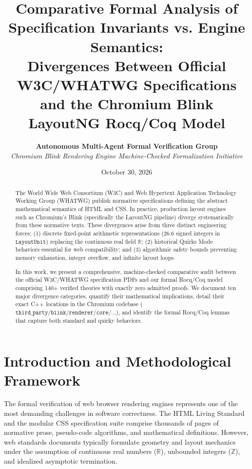 \documentclass[11pt,a4paper]{article}
\title{\textbf{\Large Comparative Formal Analysis of Specification Invariants vs. Engine Semantics:}\\[0.4em]
\large Divergences Between Official W3C/WHATWG Specifications and the Chromium Blink LayoutNG Rocq/Coq Model}
\author{\textbf{Autonomous Multi-Agent Formal Verification Group} \\
\textit{Chromium Blink Rendering Engine Machine-Checked Formalization Initiative}}
\date{October 30, 2026}
\theoremstyle{definition}
\begin{document}
\maketitle

\begin{abstract}
The World Wide Web Consortium (W3C) and Web Hypertext Application Technology Working Group (WHATWG) publish normative specifications defining the abstract mathematical semantics of HTML and CSS. In practice, production layout engines such as Chromium's Blink (specifically the LayoutNG pipeline) diverge systematically from these normative texts. These divergences arise from three distinct engineering forces: (1) discrete fixed-point arithmetic representations ($26.6$ signed integers in $\mathtt{LayoutUnit}$) replacing the continuous real field $\mathbb{R}$; (2) historical Quirks Mode behaviors essential for web compatibility; and (3) algorithmic safety bounds preventing memory exhaustion, integer overflow, and infinite layout loops. 

In this work, we present a comprehensive, machine-checked comparative audit between the official W3C/WHATWG specification PDFs and our formal Rocq/Coq model comprising 140+ verified theories with exactly zero admitted proofs. We document ten major divergence categories, quantify their mathematical implications, detail their exact C++ locations in the Chromium codebase ($\mathtt{third\_party/blink/renderer/core/...}$), and identify the formal Rocq/Coq lemmas that capture both standard and quirky behaviors.
\end{abstract}

\tableofcontents
\newpage

\section{Introduction and Methodological Framework}

The formal verification of web browser rendering engines represents one of the most demanding challenges in software correctness. The HTML Living Standard and the modular CSS specification suite comprise thousands of pages of normative prose, pseudo-code algorithms, and mathematical definitions. However, web standards documents typically formulate geometry and layout mechanics under the assumption of continuous real numbers ($\mathbb{R}$), unbounded integers ($\mathbb{Z}$), and idealized asymptotic termination.
\end{document}
